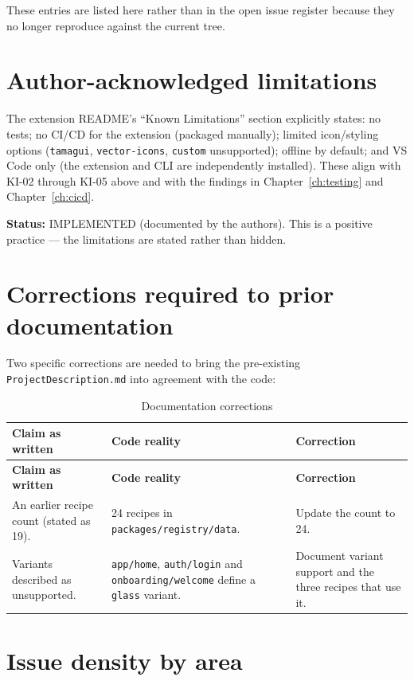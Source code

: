 These entries are listed here rather than in the open issue register because
they no longer reproduce against the current tree.

\section{Author-acknowledged limitations}

The extension README's ``Known Limitations'' section explicitly states: no tests;
no CI/CD for the extension (packaged manually); limited icon/styling options
(\texttt{tamagui}, \texttt{vector-icons}, \texttt{custom} unsupported); offline
by default; and VS Code only (the extension and CLI are independently installed).
These align with KI-02 through KI-05 above and with the findings in
Chapter~\ref{ch:testing} and Chapter~\ref{ch:cicd}.

\textbf{Status:} IMPLEMENTED (documented by the authors). This is a positive
practice --- the limitations are stated rather than hidden.

\section{Corrections required to prior documentation}

Two specific corrections are needed to bring the pre-existing
\texttt{ProjectDescription.md} into agreement with the code:

\begin{longtable}{@{}L{5.2cm}L{4.2cm}L{4.6cm}@{}}
\caption{Documentation corrections}\\
\toprule
\textbf{Claim as written} & \textbf{Code reality} & \textbf{Correction} \\
\midrule
\endfirsthead
\toprule
\textbf{Claim as written} & \textbf{Code reality} & \textbf{Correction} \\
\midrule
\endhead
An earlier recipe count (stated as 19). & 24 recipes in
\texttt{packages/registry/data}. & Update the count to 24. \\
Variants described as unsupported. & \texttt{app/home}, \texttt{auth/login} and
\texttt{onboarding/welcome} define a \texttt{glass} variant. & Document variant
support and the three recipes that use it. \\
\bottomrule
\end{longtable}

\section{Issue density by area}

